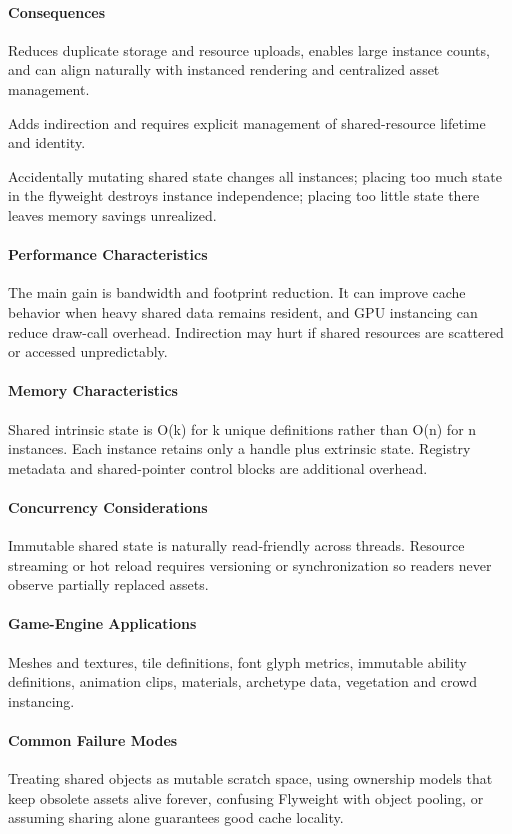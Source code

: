 \documentclass[11pt]{article}
\begin{document}
\paragraph{Consequences}
\begin{description}[leftmargin=2.7cm,style=nextline]
\item[Benefits] Reduces duplicate storage and resource uploads, enables large instance counts, and can align naturally with instanced rendering and centralized asset management.
\item[Costs] Adds indirection and requires explicit management of shared-resource lifetime and identity.
\item[Risks] Accidentally mutating shared state changes all instances; placing too much state in the flyweight destroys instance independence; placing too little state there leaves memory savings unrealized.
\end{description}
\paragraph{Performance Characteristics} The main gain is bandwidth and footprint reduction. It can improve cache behavior when heavy shared data remains resident, and GPU instancing can reduce draw-call overhead. Indirection may hurt if shared resources are scattered or accessed unpredictably.
\paragraph{Memory Characteristics} Shared intrinsic state is O(k) for k unique definitions rather than O(n) for n instances. Each instance retains only a handle plus extrinsic state. Registry metadata and shared-pointer control blocks are additional overhead.
\paragraph{Concurrency Considerations} Immutable shared state is naturally read-friendly across threads. Resource streaming or hot reload requires versioning or synchronization so readers never observe partially replaced assets.
\paragraph{Game-Engine Applications} Meshes and textures, tile definitions, font glyph metrics, immutable ability definitions, animation clips, materials, archetype data, vegetation and crowd instancing.
\paragraph{Common Failure Modes} Treating shared objects as mutable scratch space, using ownership models that keep obsolete assets alive forever, confusing Flyweight with object pooling, or assuming sharing alone guarantees good cache locality.
\end{document}
